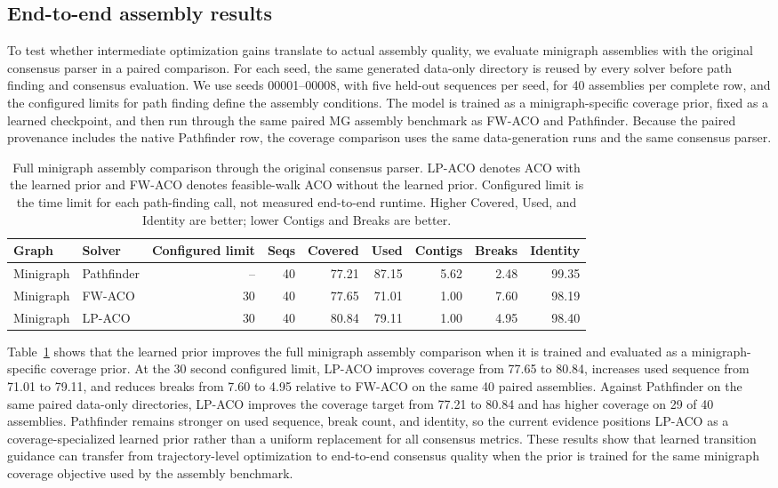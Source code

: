 \documentclass[11pt]{article}
\begin{document}
\subsection{End-to-end assembly results}

To test whether intermediate optimization gains translate to actual assembly quality, we evaluate minigraph assemblies with the original consensus parser in a paired comparison. For each seed, the same generated data-only directory is reused by every solver before path finding and consensus evaluation. We use seeds 00001--00008, with five held-out sequences per seed, for 40 assemblies per complete row, and the configured limits for path finding define the assembly conditions. The model is trained as a minigraph-specific coverage prior, fixed as a learned checkpoint, and then run through the same paired MG assembly benchmark as FW-ACO and Pathfinder. Because the paired provenance includes the native Pathfinder row, the coverage comparison uses the same data-generation runs and the same consensus parser.

\begin{table}[t]
\centering
\small
\caption{Full minigraph assembly comparison through the original consensus parser. LP-ACO denotes ACO with the learned prior and FW-ACO denotes feasible-walk ACO without the learned prior. Configured limit is the time limit for each path-finding call, not measured end-to-end runtime. Higher Covered, Used, and Identity are better; lower Contigs and Breaks are better.}
\label{tab:partial-full-assembly}
\begin{tabular}{llrrrrrrr}
\hline
Graph & Solver & Configured limit & Seqs & Covered & Used & Contigs & Breaks & Identity \\
\hline
Minigraph & Pathfinder & -- & 40 & 77.21 & 87.15 & 5.62 & 2.48 & 99.35 \\
Minigraph & FW-ACO & 30 & 40 & 77.65 & 71.01 & 1.00 & 7.60 & 98.19 \\
Minigraph & LP-ACO & 30 & 40 & 80.84 & 79.11 & 1.00 & 4.95 & 98.40 \\
\hline
\end{tabular}
\end{table}

Table~\ref{tab:partial-full-assembly} shows that the learned prior improves the full minigraph assembly comparison when it is trained and evaluated as a minigraph-specific coverage prior. At the 30 second configured limit, LP-ACO improves coverage from 77.65 to 80.84, increases used sequence from 71.01 to 79.11, and reduces breaks from 7.60 to 4.95 relative to FW-ACO on the same 40 paired assemblies. Against Pathfinder on the same paired data-only directories, LP-ACO improves the coverage target from 77.21 to 80.84 and has higher coverage on 29 of 40 assemblies. Pathfinder remains stronger on used sequence, break count, and identity, so the current evidence positions LP-ACO as a coverage-specialized learned prior rather than a uniform replacement for all consensus metrics. These results show that learned transition guidance can transfer from trajectory-level optimization to end-to-end consensus quality when the prior is trained for the same minigraph coverage objective used by the assembly benchmark.
\end{document}
